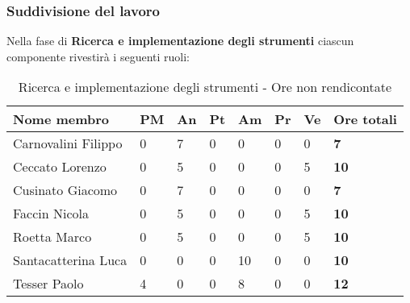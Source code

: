 		\subsubsection{Suddivisione del lavoro} %
		\label{ssub:suddivisione_del_lavoro}
		Nella fase di \textbf{Ricerca e implementazione degli strumenti} ciascun componente rivestirà i seguenti ruoli: \\
			\begin{table}[!ht]
				\begin{center}
					\begin{tabularx}{0.9\textwidth}{|l|l|l|l|l|l|l|X|}
						\hline
						\textbf{Nome membro} & \textbf{PM} & \textbf{An} & \textbf{Pt} & \textbf{Am} & \textbf{Pr} & \textbf{Ve} & \textbf{Ore totali} \\
						\hline
						Carnovalini Filippo & 0 & 7 & 0 & 0 & 0 & 0 & \textbf{7} \\
						\hline
						Ceccato Lorenzo & 0 & 5 & 0 & 0 & 0 & 5 & \textbf{10} \\
						\hline
						Cusinato Giacomo & 0 & 7 & 0 & 0 & 0 & 0 & \textbf{7} \\
						\hline
						Faccin Nicola & 0 & 5 & 0 & 0 & 0 & 5 & \textbf{10} \\
						\hline
						Roetta Marco & 0 & 5 & 0 & 0 & 0 & 5 & \textbf{10} \\
						\hline
						Santacatterina Luca & 0 & 0 & 0 & 10 & 0 & 0 & \textbf{10} \\
						\hline
						Tesser Paolo & 4 & 0 & 0 & 8 & 0 & 0 & \textbf{12} \\
						\hline
					\end{tabularx}
				\end{center}
			\caption{Ricerca e implementazione degli strumenti - Ore non rendicontate}
			\end{table}
			
